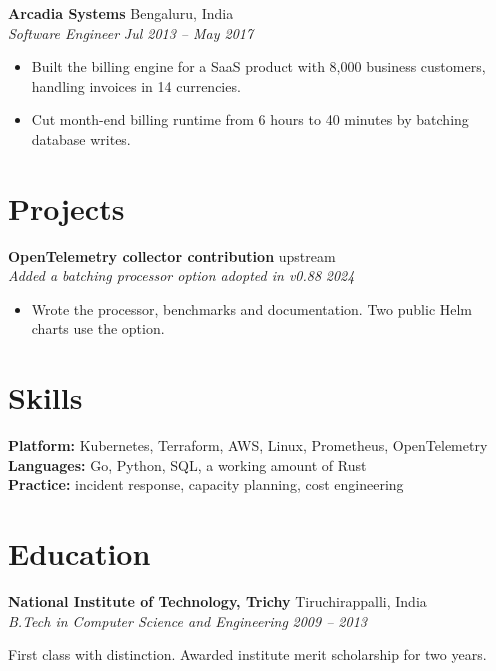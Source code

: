 \documentclass[10.5pt,a4paper]{article}
\newcommand{\role}[4]{%
  \textbf{#1} \hfill #2\\%
  \textit{#3} \hfill \textit{#4}\par\vspace{0.15em}%
}
\newenvironment{bullets}{%
  \begin{itemize}[leftmargin=1.05em,itemsep=0.14em,topsep=0.14em,parsep=0pt,label=\textbullet]%
}{\end{itemize}}
\begin{document}
\role{Arcadia Systems}{Bengaluru, India}{Software Engineer}{Jul 2013 -- May 2017}
\begin{bullets}
  \item Built the billing engine for a SaaS product with 8,000 business customers, handling invoices in 14 currencies.
  \item Cut month-end billing runtime from 6 hours to 40 minutes by batching database writes.
\end{bullets}

\section{Projects}
\role{OpenTelemetry collector contribution}{upstream}{Added a batching processor option adopted in v0.88}{2024}
\begin{bullets}
  \item Wrote the processor, benchmarks and documentation. Two public Helm charts use the option.
\end{bullets}

\section{Skills}
\textbf{Platform:} Kubernetes, Terraform, AWS, Linux, Prometheus, OpenTelemetry\\
\textbf{Languages:} Go, Python, SQL, a working amount of Rust\\
\textbf{Practice:} incident response, capacity planning, cost engineering

\section{Education}
\role{National Institute of Technology, Trichy}{Tiruchirappalli, India}{B.Tech in Computer Science and Engineering}{2009 -- 2013}
First class with distinction. Awarded institute merit scholarship for two years.
\end{document}
